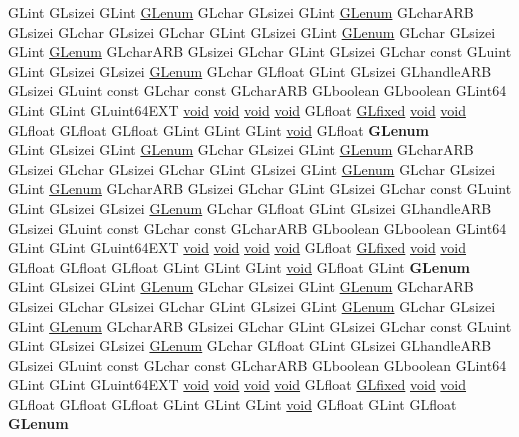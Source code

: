\begin{DoxyCompactItemize}
\begin{tabbing}
\>GLint GLsizei GLint \hyperlink{interfacevoid}{GLenum} GLchar GLsizei GLint \hyperlink{interfacevoid}{GLenum} GLcharARB GLsizei GLchar GLsizei GLchar GLint GLsizei GLint \hyperlink{interfacevoid}{GLenum} GLchar GLsizei GLint \hyperlink{interfacevoid}{GLenum} GLcharARB GLsizei GLchar GLint GLsizei GLchar const GLuint GLint GLsizei GLsizei \hyperlink{interfacevoid}{GLenum} GLchar GLfloat GLint GLsizei GLhandleARB GLsizei GLuint const GLchar const GLcharARB GLboolean GLboolean GLint64 GLint GLint GLuint64EXT \hyperlink{interfacevoid}{void} \hyperlink{interfacevoid}{void} \hyperlink{interfacevoid}{void} \hyperlink{interfacevoid}{void} GLfloat \hyperlink{glheader_8h_ad6d3fa892df40dedf48ee6d84529ae5e}{GLfixed} \hyperlink{interfacevoid}{void} \hyperlink{interfacevoid}{void} GLfloat GLfloat GLfloat GLint GLint GLint \hyperlink{interfacevoid}{void} GLfloat {\bfseries GLenum}\\
\>GLint GLsizei GLint \hyperlink{interfacevoid}{GLenum} GLchar GLsizei GLint \hyperlink{interfacevoid}{GLenum} GLcharARB GLsizei GLchar GLsizei GLchar GLint GLsizei GLint \hyperlink{interfacevoid}{GLenum} GLchar GLsizei GLint \hyperlink{interfacevoid}{GLenum} GLcharARB GLsizei GLchar GLint GLsizei GLchar const GLuint GLint GLsizei GLsizei \hyperlink{interfacevoid}{GLenum} GLchar GLfloat GLint GLsizei GLhandleARB GLsizei GLuint const GLchar const GLcharARB GLboolean GLboolean GLint64 GLint GLint GLuint64EXT \hyperlink{interfacevoid}{void} \hyperlink{interfacevoid}{void} \hyperlink{interfacevoid}{void} \hyperlink{interfacevoid}{void} GLfloat \hyperlink{glheader_8h_ad6d3fa892df40dedf48ee6d84529ae5e}{GLfixed} \hyperlink{interfacevoid}{void} \hyperlink{interfacevoid}{void} GLfloat GLfloat GLfloat GLint GLint GLint \hyperlink{interfacevoid}{void} GLfloat GLint {\bfseries GLenum}\\
\>GLint GLsizei GLint \hyperlink{interfacevoid}{GLenum} GLchar GLsizei GLint \hyperlink{interfacevoid}{GLenum} GLcharARB GLsizei GLchar GLsizei GLchar GLint GLsizei GLint \hyperlink{interfacevoid}{GLenum} GLchar GLsizei GLint \hyperlink{interfacevoid}{GLenum} GLcharARB GLsizei GLchar GLint GLsizei GLchar const GLuint GLint GLsizei GLsizei \hyperlink{interfacevoid}{GLenum} GLchar GLfloat GLint GLsizei GLhandleARB GLsizei GLuint const GLchar const GLcharARB GLboolean GLboolean GLint64 GLint GLint GLuint64EXT \hyperlink{interfacevoid}{void} \hyperlink{interfacevoid}{void} \hyperlink{interfacevoid}{void} \hyperlink{interfacevoid}{void} GLfloat \hyperlink{glheader_8h_ad6d3fa892df40dedf48ee6d84529ae5e}{GLfixed} \hyperlink{interfacevoid}{void} \hyperlink{interfacevoid}{void} GLfloat GLfloat GLfloat GLint GLint GLint \hyperlink{interfacevoid}{void} GLfloat GLint GLfloat {\bfseries GLenum}\\

\end{tabbing}
\end{DoxyCompactItemize}
